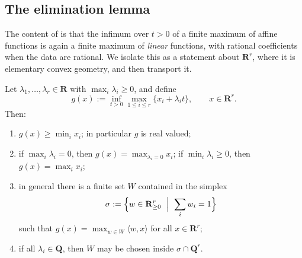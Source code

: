 \subsection{The elimination lemma}
\label{sec:ch35-elimination}

The content of  is that the infimum over
$t>0$ of a finite maximum of affine functions is again a finite maximum of
\emph{linear} functions, with rational coefficients when the data are
rational.  We isolate this as a statement about $\mathbf R^r$, where it is
elementary convex geometry, and then transport it.

\begin{lemma}
\label{lem:ch35-elimination}
Let $\lambda_1,\ldots,\lambda_r\in\mathbf R$ with
$\max_i\lambda_i\geq0$, and define
\begin{equation}
\label{eq:ch35-elimination-g}
 g(x):=\inf_{t>0}\max_{1\leq i\leq r}\{x_i+\lambda_it\},
 \qquad x\in\mathbf R^r .
\end{equation}
Then:
\begin{enumerate}
\item $g(x)\geq\min_ix_i$; in particular $g$ is real valued;
\item if $\max_i\lambda_i=0$, then $g(x)=\max_{\lambda_i=0}x_i$; if
 $\min_i\lambda_i\geq0$, then $g(x)=\max_ix_i$;
\item in general there is a finite set $W$ contained in the simplex
\begin{equation}
\label{eq:ch35-elimination-simplex}
 \sigma:=\Bigl\{w\in\mathbf R^r_{\geq0}\ \Bigm|\ \sum_iw_i=1\Bigr\}
\end{equation}
 such that $g(x)=\max_{w\in W}\langle w,x\rangle$ for all
 $x\in\mathbf R^r$;
\item if all $\lambda_i\in\mathbf Q$, then $W$ may be chosen inside
 $\sigma\cap\mathbf Q^r$.
\end{enumerate}
\par
\end{lemma}

